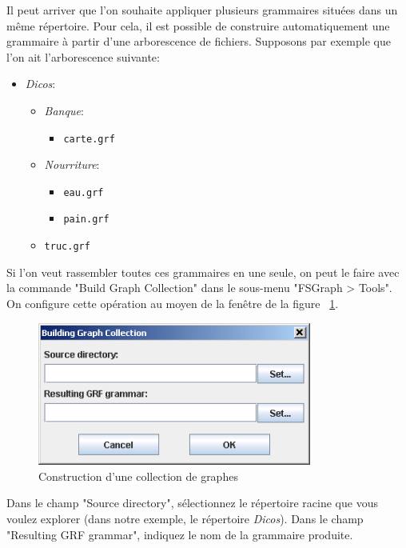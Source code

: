 Il peut arriver que l’on souhaite appliquer plusieurs grammaires situées dans un même
répertoire. Pour cela, il est possible de construire automatiquement une grammaire à partir
d’une arborescence de fichiers. Supposons par exemple que l’on ait l’arborescence suivante:


\begin{itemize}
  \item \textit{Dicos}:
  \begin{itemize}
    \item \textit{Banque}:
    \begin{itemize}
      \item \texttt{carte.grf}
    \end{itemize}
    \item \textit{Nourriture}:
    \begin{itemize}
      \item \texttt{eau.grf}
      \item \texttt{pain.grf}
    \end{itemize}
    \item \texttt{truc.grf}
  \end{itemize}
\end{itemize}

\noindent Si l’on veut rassembler toutes ces grammaires en une seule, on peut le faire avec la
commande "Build Graph Collection" dans le sous-menu "FSGraph > Tools". On configure cette
opération au moyen de la fenêtre de la figure
~\ref{fig-build-graph-collection}.

\begin{figure}[!h]
\begin{center}
\includegraphics[width=9cm]{resources/img/fig6-20.png}
\caption{Construction d’une collection de graphes\label{fig-build-graph-collection}}
\end{center}
\end{figure}

\noindent Dans le champ "Source directory", sélectionnez le répertoire racine que vous voulez
explorer (dans notre exemple, le répertoire \textit{Dicos}).  Dans le champ "Resulting GRF grammar",
indiquez le nom de la grammaire produite.



